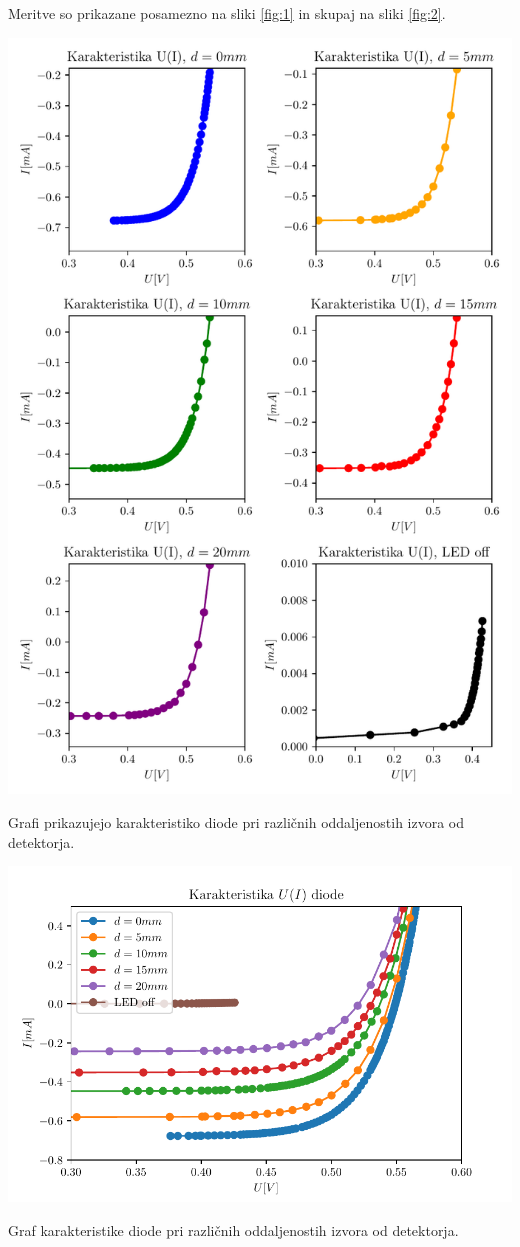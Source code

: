 \documentclass[12pt]{report}
\begin{document}
Meritve so prikazane posamezno na sliki \ref{fig:1} in skupaj na sliki \ref{fig:2}.

\begin{slika}[H]
  \centering
  \includegraphics{graf1}
  \caption{\small Grafi prikazujejo karakteristiko diode pri različnih oddaljenostih izvora od detektorja.}
  \label{fig:1}
\end{slika}

\begin{slika}[H]
  \centering
  \includegraphics{karakteristika}
  \caption{\small Graf karakteristike diode pri različnih oddaljenostih izvora od detektorja.}
  \label{fig:2}
\end{slika}
\end{document}
